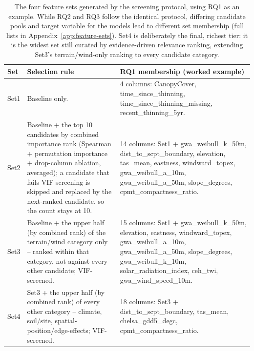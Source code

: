 \begin{table}[!htbp]
\centering
\scriptsize
\renewcommand{\arraystretch}{1.2}
\begin{tabular}{p{1cm}p{5.3cm}p{7.2cm}}
\toprule
Set & Selection rule & RQ1 membership (worked example) \\
\midrule
Set1 & Baseline only. & 4 columns: CanopyCover, time\_since\_thinning,
time\_since\_thinning\_missing, recent\_thinning\_5yr. \\
Set2 & Baseline + the top 10 candidates by combined importance rank (Spearman + permutation
importance + drop-column ablation, averaged); a candidate that fails VIF screening is skipped and
replaced by the next-ranked candidate, so the count stays at 10. & 14 columns: Set1 +
gwa\_weibull\_k\_50m, dist\_to\_scpt\_boundary, elevation, tas\_mean, eastness, windward\_topex,
gwa\_weibull\_a\_10m, gwa\_weibull\_a\_50m, slope\_degrees, cpmt\_compactness\_ratio. \\
Set3 & Baseline + the upper half (by combined rank) of the terrain/wind category only -- ranked
within that category, not against every other candidate; VIF-screened. & 15 columns: Set1 +
gwa\_weibull\_k\_50m, elevation, eastness, windward\_topex, gwa\_weibull\_a\_10m,
gwa\_weibull\_a\_50m, slope\_degrees, gwa\_weibull\_k\_10m, solar\_radiation\_index, ceh\_twi,
gwa\_wind\_speed\_10m. \\
Set4 & Set3 + the upper half (by combined rank) of every other category -- climate, soil/site,
spatial-position/edge-effects; VIF-screened. & 18 columns: Set3 + dist\_to\_scpt\_boundary,
tas\_mean, chelsa\_gdd5\_degc, cpmt\_compactness\_ratio. \\
\bottomrule
\end{tabular}
\caption{The four feature sets generated by the screening protocol, using RQ1 as an example. While RQ2 and RQ3 follow the identical protocol, differing candidate pools and target variable for the models lead to different set membership (full lists in Appendix~\ref{app:feature-sets}). Set4 is deliberately the final, richest tier: it is the widest set still curated by evidence-driven relevance ranking, extending Set3's terrain/wind-only ranking to every candidate category.}
\label{tab:feature-sets-composition-rq1}
\end{table}

